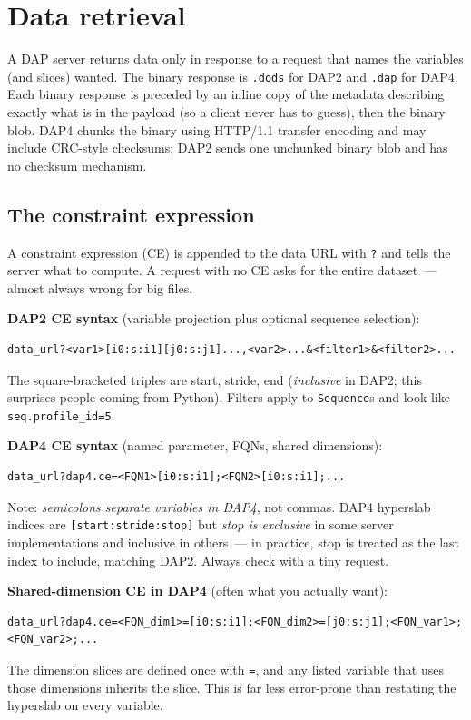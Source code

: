 \documentclass[11pt]{article}
\begin{document}
\section{Data retrieval}

A DAP server returns data only in response to a request that names
the variables (and slices) wanted. The binary response is
\texttt{.dods} for DAP2 and \texttt{.dap} for DAP4. Each binary
response is preceded by an inline copy of the metadata describing
exactly what is in the payload (so a client never has to guess), then
the binary blob. DAP4 chunks the binary using HTTP/1.1 transfer
encoding and may include CRC-style checksums; DAP2 sends one
unchunked binary blob and has no checksum mechanism.

\subsection{The constraint expression}

A constraint expression (CE) is appended to the data URL with
\texttt{?} and tells the server what to compute. A request with no CE
asks for the entire dataset~--- almost always wrong for big files.

\textbf{DAP2 CE syntax} (variable projection plus optional sequence
selection):
\begin{lstlisting}
data_url?<var1>[i0:s:i1][j0:s:j1]...,<var2>...&<filter1>&<filter2>...
\end{lstlisting}
The square-bracketed triples are start, stride, end (\emph{inclusive}
in DAP2; this surprises people coming from Python). Filters apply to
\texttt{Sequence}s and look like \texttt{seq.profile\_id=5}.

\textbf{DAP4 CE syntax} (named parameter, FQNs, shared dimensions):
\begin{lstlisting}
data_url?dap4.ce=<FQN1>[i0:s:i1];<FQN2>[i0:s:i1];...
\end{lstlisting}
Note: \emph{semicolons separate variables in DAP4}, not commas.
DAP4 hyperslab indices are \texttt{[start:stride:stop]} but
\emph{stop is exclusive} in some server implementations and inclusive
in others~--- in practice, stop is treated as the last index to
include, matching DAP2. Always check with a tiny request.

\textbf{Shared-dimension CE in DAP4} (often what you actually want):
\begin{lstlisting}
data_url?dap4.ce=<FQN_dim1>=[i0:s:i1];<FQN_dim2>=[j0:s:j1];<FQN_var1>;<FQN_var2>;...
\end{lstlisting}
The dimension slices are defined once with \texttt{=}, and any listed
variable that uses those dimensions inherits the slice. This is far
less error-prone than restating the hyperslab on every variable.
\end{document}

